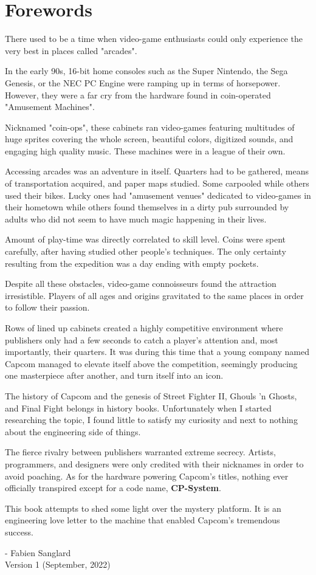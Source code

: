 \chapter*{Forewords}

There used to be a time when video-game enthusiasts could only experience the very best in places called "arcades". 

In the early 90s, 16-bit home consoles such as the Super Nintendo, the Sega Genesis, or the NEC PC Engine were ramping up in terms of horsepower. However, they were a far cry from the hardware found in coin-operated "Amusement Machines".

Nicknamed "coin-ops", these cabinets ran video-games featuring multitudes of huge sprites covering the whole screen, beautiful colors, digitized sounds, and engaging high quality music. These machines were in a league of their own.

Accessing arcades was an adventure in itself. Quarters had to be gathered, means of transportation acquired, and paper maps studied. Some carpooled while others used their bikes. Lucky ones had "amusement venues" dedicated to video-games in their hometown while others found themselves in a dirty pub surrounded by adults who did not seem to have much magic happening in their lives. 

Amount of play-time was directly correlated to skill level. Coins were spent carefully, after having studied other people's techniques. The only certainty resulting from the expedition was a day ending with empty pockets. 

Despite all these obstacles, video-game connoisseurs found the attraction irresistible. Players of all ages and origins gravitated to the same places in order to follow their passion. 

Rows of lined up cabinets created a highly competitive environment where publishers only had a few seconds to catch a player's attention and, most importantly, their quarters. It was during this time that a young company named Capcom  managed to elevate itself above the competition, seemingly producing one masterpiece after another, and turn itself into an icon.

The history of Capcom and the genesis of Street Fighter II, Ghouls 'n Ghosts, and Final Fight belongs in history books. Unfortunately when I started researching the topic, I found little to satisfy my curiosity and next to nothing about the engineering side of things. 

The fierce rivalry between publishers warranted extreme secrecy. Artists, programmers, and designers were only credited with their nicknames in order to avoid poaching. As for the hardware powering Capcom's titles, nothing ever officially transpired except for a code name, \textbf{CP-System}.

This book attempts to shed some light over the mystery platform. It is an engineering love letter to the machine that enabled Capcom's tremendous success. 

- Fabien Sanglard\\
 Version 1 (September, 2022)
